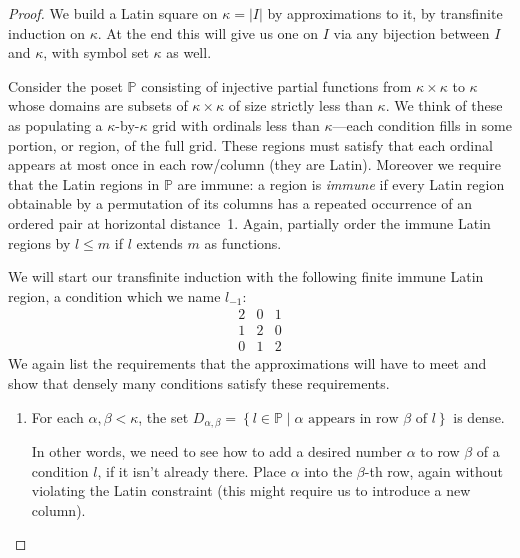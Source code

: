 \documentclass[12pt,a4paper]{article}
\newcommand{\st}{\; | \;}
\newcommand{\set}[2]{\left\{#1\st #2 \right\}}
\renewcommand{\P}{\mathbb{P}}
\begin{document}
\begin{proof}
We build a Latin square on $\kappa=|I|$ by approximations to it, by transfinite induction on $\kappa$. At the end this will give us one on $I$ via any bijection between $I$ and $\kappa$, with symbol set $\kappa$ as well.  

Consider the poset $\P$ consisting of injective partial functions from $\kappa\times\kappa$ to $\kappa$ whose domains are subsets of $\kappa\times\kappa$ of size strictly less than $\kappa$. We think of these as populating a $\kappa$-by-$\kappa$ grid with ordinals less than $\kappa$---each condition fills in some portion, or region, of the full grid. These regions must satisfy that each ordinal appears at most once in each row/column (they are Latin). Moreover we require that the Latin regions in $\P$ are immune: a region is \textit{immune} if every Latin region  obtainable by a permutation of its columns has a repeated occurrence of an ordered pair at horizontal distance~1. Again, partially order the immune Latin regions by $l\leq m$ if $l$ extends $m$ as functions.

We will start our transfinite induction with the following finite immune Latin region, a condition which we name $l_{-1}$:
$$
\begin{array}{ccc}
2  & 0 & 1 \\ 
1 & 2 &  0  \\
 0  & 1 & 2 
\end{array}
$$
We again list the requirements that the approximations will have to meet and show that densely many conditions satisfy these requirements.
\begin{enumerate}
	\item For each $\alpha, \beta<\kappa$, the set $D_{\alpha,\beta}=\set{l \in \P}{\alpha \text{ appears in row } \beta \text{ of } l}$ is dense.
	
	In other words, we need to see how to add a desired number $\alpha$ to row $\beta$ of a condition $l$, if it isn't already there. Place $\alpha$ into the $\beta$-th row, again without violating the Latin constraint (this might require us to introduce a new column).
	

\end{enumerate}
\end{proof}
\end{document}
